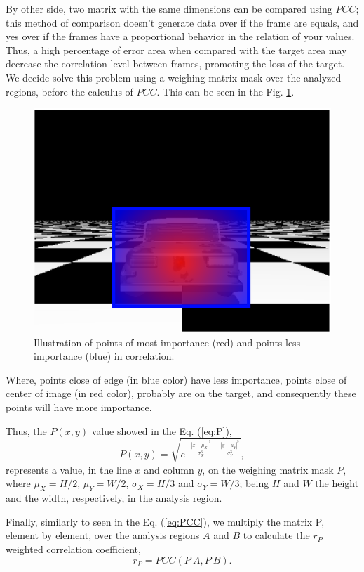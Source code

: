 By other side, two matrix with the same dimensions can be compared using $PCC$; 
this method of comparison doesn't generate data over if the frame are equals,
and yes over if the frames have a proportional behavior in the relation of your values. 
Thus, a high percentage of error area when compared with the target area 
may decrease the correlation level between frames, promoting the loss of the target. 
We decide solve this problem using a weighing matrix mask over the analyzed regions, 
before the calculus of $PCC$. This can be seen in the Fig. \ref{fig:errorpondered}.
\begin{figure}[H]
\includegraphics[width=\columnwidth]{images/imageErrorcontroled.eps}
\caption{Illustration of points of most importance (red) and points less importance (blue) in correlation.}
\label{fig:errorpondered}
\end{figure}
Where, points close of edge (in blue color) have less importance, 
points close of center of image (in red color), probably are on the target, and consequently
these points will have more importance. 

Thus, the $P(x,y)$ value showed in the Eq. (\ref{eq:P}), 
\begin{equation}\label{eq:P}
 P(x,y) = \sqrt{e^{ -\frac{|x-\mu_X|^3}{\sigma_X^3}-\frac{|y-\mu_Y|^3}{\sigma_Y^3}  }},
\end{equation}
represents a value, in the line $x$ and column $y$, on the weighing matrix mask $P$,
where $\mu_X=H/2$, $\mu_Y=W/2$, $\sigma_X=H/3$ and $\sigma_Y=W/3$; being $H$ and $W$
the height and the width, respectively, in the analysis region.

Finally, similarly to seen in the Eq. (\ref{eq:PCC}), we multiply the matrix P, 
element by element, over the analysis regions
$A$ and $B$ to calculate the $r_P$ weighted correlation coefficient, 
\begin{equation}\label{eq:rw}
 r_P = PCC(P~A, P~B).
\end{equation}


